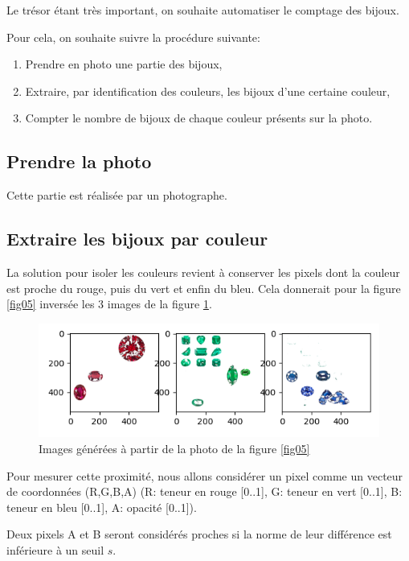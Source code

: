 Le trésor étant très important, on souhaite automatiser le comptage des bijoux.

Pour cela, on souhaite suivre la procédure suivante:
\begin{enumerate}
 \item Prendre en photo une partie des bijoux,
 \item Extraire, par identification des couleurs, les bijoux d'une certaine couleur,
 \item Compter le nombre de bijoux de chaque couleur présents sur la photo.
\end{enumerate} 

\subsection{Prendre la photo}

Cette partie est réalisée par un photographe.

\subsection{Extraire les bijoux par couleur}

La solution pour isoler les couleurs revient à conserver les pixels dont la couleur est \og proche \fg du rouge, puis du vert et enfin du bleu. Cela donnerait pour la figure \ref{fig05} inversée les 3 images de la figure \ref{fig06}.

\begin{figure}[ht!]
\begin{center}
 \includegraphics[width=.8\textwidth]{img/couleurs_isolees}
\end{center}
\vspace{-0.8cm}
\caption{\label{fig06} Images générées à partir de la photo de la figure \ref{fig05}}
\end{figure}

Pour mesurer cette proximité, nous allons considérer un pixel comme un vecteur de coordonnées (R,G,B,A) (R: teneur en rouge [0..1], G: teneur en vert [0..1], B: teneur en bleu [0..1], A: opacité [0..1]). 

Deux pixels A et B seront considérés proches si la norme de leur différence est inférieure à un seuil $s$.

